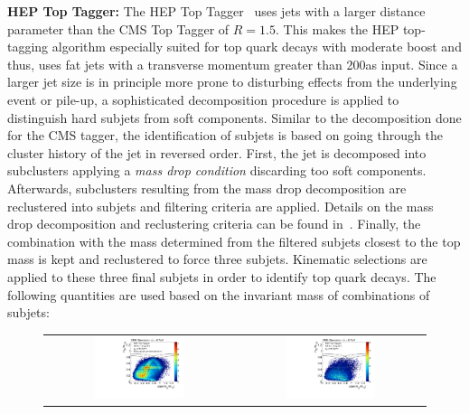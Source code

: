 \begin{description}
 \item \textbf{HEP Top Tagger:} The HEP Top Tagger~\cite{Plehn:2010st} uses jets with a larger distance parameter than the CMS Top Tagger of $R = 1.5$. This makes the HEP top-tagging algorithm especially suited for top quark decays with moderate boost and thus, uses fat jets with a transverse momentum greater than 200\gev as input. Since a larger jet size is in principle more prone to disturbing effects from the underlying event or pile-up, a sophisticated decomposition procedure is applied to distinguish hard subjets from soft components. Similar to the decomposition done for the CMS tagger, the identification of subjets is based on going through the cluster history of the jet in reversed order. First, the jet is decomposed into subclusters applying a \textit{mass drop condition} discarding too soft components. Afterwards, subclusters resulting from the mass drop decomposition are reclustered into subjets and filtering criteria are applied. Details on the mass drop decomposition and reclustering criteria can be found in~\cite{CMS:2014fya}. Finally, the combination with the mass determined from the filtered subjets closest to the top mass is kept and reclustered to force three subjets. Kinematic selections are applied to these three final subjets in order to identify top quark decays. The following quantities are used based on the invariant mass of combinations of subjets:
\begin{figure}[!tp]
  \centering 
  \begin{tabular}{cc}
    \includegraphics[width=0.49\textwidth]{figures/Pheno2DPlot_HTT2D_NOheptoptag_NOmasscut_hists_Signal_Add.pdf} & 
    \includegraphics[width=0.49\textwidth]{figures/Pheno2DPlot_HTT2D_NOheptoptag_NOmasscut_hists_Background_Add.pdf}

\end{tabular}
\end{figure}
\end{description}
